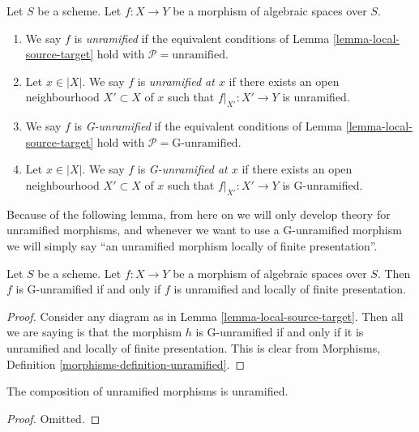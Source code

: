 \begin{definition}
\label{definition-unramified}
Let $S$ be a scheme.
Let $f : X \to Y$ be a morphism of algebraic spaces over $S$.
\begin{enumerate}
\item We say $f$ is {\it unramified} if the equivalent conditions of
Lemma \ref{lemma-local-source-target}
hold with $\mathcal{P} = \text{unramified}$.
\item Let $x \in |X|$. We say $f$ is {\it unramified at $x$} if there
exists an open neighbourhood $X' \subset X$ of $x$ such that
$f|_{X'} : X' \to Y$ is unramified.
\item We say $f$ is {\it G-unramified} if the equivalent conditions of
Lemma \ref{lemma-local-source-target}
hold with $\mathcal{P} = \text{G-unramified}$.
\item Let $x \in |X|$. We say $f$ is {\it G-unramified at $x$} if there
exists an open neighbourhood $X' \subset X$ of $x$ such that
$f|_{X'} : X' \to Y$ is G-unramified.
\end{enumerate}
\end{definition}

\noindent
Because of the following lemma, from here on we will only develop theory
for unramified morphisms, and whenever we want to use a G-unramified
morphism we will simply say ``an unramified morphism locally of finite
presentation''.

\begin{lemma}
\label{lemma-unramified-G-unramified}
Let $S$ be a scheme.
Let $f : X \to Y$ be a morphism of algebraic spaces over $S$.
Then $f$ is G-unramified if and only if $f$ is unramified and
locally of finite presentation.
\end{lemma}

\begin{proof}
Consider any diagram as in
Lemma \ref{lemma-local-source-target}.
Then all we are saying is that the morphism $h$ is
G-unramified if and only if it is unramified and locally of finite
presentation. This is clear from
Morphisms, Definition \ref{morphisms-definition-unramified}.
\end{proof}

\begin{lemma}
\label{lemma-composition-unramified}
The composition of unramified morphisms is unramified.
\end{lemma}

\begin{proof}
Omitted.
\end{proof}

